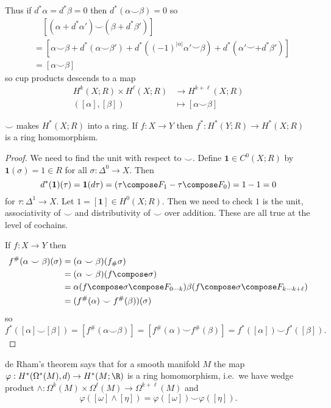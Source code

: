 \documentclass[a4paper]{article}
\newcommand*{\cp}{\smile} %
\begin{document}
Thus if \(d^*\alpha = d^*\beta = 0\) then \(d^*(\alpha \cp \beta) = 0\) so
\begin{align*}
  &\quad [(\alpha + d^* \alpha') \cp (\beta + d^* \beta')] \\
  &= [\alpha \cp \beta + d^*(\alpha \cp \beta') + d^*((-1)^{|\alpha|} \alpha' \cp \beta) + d^*(\alpha' \cp + d^* \beta')] \\
  &= [\alpha \cp \beta]
\end{align*}
so cup products descends to a map
\begin{align*}
  H^k(X; R) \times H^\ell(X; R) &\to H^{k + \ell}(X; R) \\
  ([\alpha], [\beta]) &\mapsto [\alpha \cp \beta]
\end{align*}

\begin{proposition}
  \(\cp\) makes \(H^*(X; R)\) into a ring. If \(f: X \to Y\) then \(f^*: H^*(Y; R) \to H^*(X; R)\) is a ring homomorphism.
\end{proposition}

\begin{proof}
  We need to find the unit with respect to \(\cp\). Define \(\mathbf 1 \in C^0(X; R)\) by \(\mathbf 1(\sigma) = 1 \in R\) for all \(\sigma: \Delta^0 \to X\). Then
  \[
    d^*(\mathbf 1)(\tau) = \mathbf 1(d \tau) = \mathbf (\tau \compose F_1 - \tau \compose F_0) = 1 - 1 = 0
  \]
  for \(\tau: \Delta^1 \to X\). Let \(1 = [\mathbf 1] \in H^0(X; R)\). Then we need to check \(1\) is the unit, associativity of \(\cp\) and distributivity of \(\cp\) over addition. These are all true at the level of cochains.

  If \(f: X \to Y\) then
  \begin{align*}
    f^\#(\alpha \cp \beta) (\sigma)
    &= (\alpha \cp \beta) (f_\# \sigma) \\
    &= (\alpha \cp \beta) (f \compose \sigma) \\
    &= \alpha(f \compose \sigma \compose F_{0 \cdots k}) \beta (f \compose \sigma \compose F_{k \cdots k + \ell}) \\
    &= (f^\#(\alpha) \cp f^\#(\beta)) (\sigma)
  \end{align*}
  so
  \[
    f^*([\alpha] \cp [\beta])
    = [f^\#(\alpha \cp \beta)]
    = [f^\#(\alpha) \cp f^\#(\beta)]
    = f^*([\alpha]) \cp f^*([\beta]).
  \]
\end{proof}

\begin{remark}
  de Rham's theorem says that for a smooth manifold \(M\) the map \(\varphi: H^*(\Omega^*(M), d) \to H^*(M; \R)\) is a ring homomorphism, i.e.\ we have wedge product \(\wedge: \Omega^k(M) \times \Omega^\ell(M) \to \Omega^{k + \ell}(M)\) and
  \[
    \varphi([\omega] \wedge [\eta]) = \varphi([\omega]) \cp \varphi([\eta]).
  \]
\end{remark}
\end{document}
